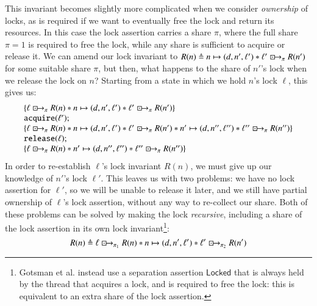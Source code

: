 \documentclass[runningheads]{llncs}
\newcommand{\islock}{\boxdotright}
\begin{document}
This invariant becomes slightly more complicated when we consider \emph{ownership} of locks, as is required if we want to eventually free the lock and return its resources. In this case the lock assertion carries a share $\pi$, where the full share $\pi = 1$ is required to free the lock, while any share is sufficient to acquire or release it. We can amend our lock invariant to $R(n) \triangleq n \mapsto (d, n', \ell') * \ell' \islock_\pi R(n')$ for some suitable share $\pi$, but then, what happens to the share of $n'$'s %
 lock when we release the lock on $n$? Starting from a state in which we hold $n$'s lock $\ell$, this gives us:
$$\begin{array}{l}
\{ \ell \islock_\pi R(n) * n \mapsto (d, n', \ell') * \ell' \islock_\pi R(n') \}\\
\texttt{acquire}(\ell');\\
\{ \ell \islock_\pi R(n) * n \mapsto (d, n', \ell') * \ell' \islock_\pi R(n') * n' \mapsto (d, n'', \ell'') * \ell'' \islock_\pi R(n'') \}\\
\texttt{release}(\ell);\\
\{ \ell \islock_\pi R(n) * n' \mapsto (d, n'', \ell'') * \ell'' \islock_\pi R(n'') \}
\end{array}$$
In order to re-establish $\ell$'s lock invariant $R(n)$, we must give up our knowledge of $n'$'s lock $\ell'$. This leaves us with two problems: we have no lock assertion for $\ell'$, so we will be unable to release it later, and we still have partial ownership of $\ell$'s lock assertion, without any way to re-collect our share. Both of these problems can be solved by making the lock \emph{recursive}, including a share of the lock assertion in its own lock invariant\footnote{Gotsman et al. instead use a separation assertion $\mathsf{Locked}$ that is always held by the thread that acquires a lock, and is required to free the lock: this is equivalent to an extra share of the lock assertion.}:
$$R(n) \triangleq \ell \islock_{\pi_1} R(n) * n \mapsto (d, n', \ell') * \ell' \islock_{\pi_2} R(n')$$
\end{document}
